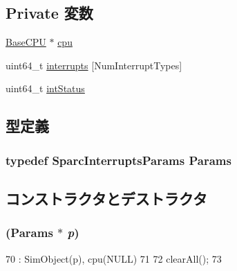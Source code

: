 \subsection*{Private 変数}
\begin{DoxyCompactItemize}
\item 
\hyperlink{classBaseCPU}{BaseCPU} $\ast$ \hyperlink{classSparcISA_1_1Interrupts_a7a31ca9fefb2fe821f29a270678912db}{cpu}
\item 
uint64\_\-t \hyperlink{classSparcISA_1_1Interrupts_af921da626984c1144929206fb7c572e4}{interrupts} \mbox{[}NumInterruptTypes\mbox{]}
\item 
uint64\_\-t \hyperlink{classSparcISA_1_1Interrupts_a7bd80958fef7b80f720d1e764c63adb4}{intStatus}
\end{DoxyCompactItemize}


\subsection{型定義}
\hypertarget{classSparcISA_1_1Interrupts_a1480e28e439219daadcc82008890f5d7}{
\subsubsection[{Params}]{\setlength{\rightskip}{0pt plus 5cm}typedef SparcInterruptsParams {\bf Params}}}
\label{classSparcISA_1_1Interrupts_a1480e28e439219daadcc82008890f5d7}


\subsection{コンストラクタとデストラクタ}
\hypertarget{classSparcISA_1_1Interrupts_a3d148759405b99148e0c34750966edb1}{
\subsubsection[{Interrupts}]{ ({\bf Params} $\ast$ {\em p})}}
\label{classSparcISA_1_1Interrupts_a3d148759405b99148e0c34750966edb1}



\begin{DoxyCode}
70                            : SimObject(p), cpu(NULL)
71     {
72         clearAll();
73     }
\end{DoxyCode}


